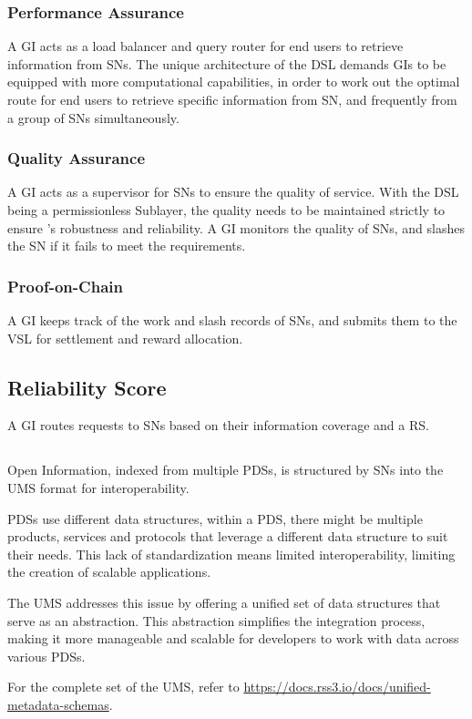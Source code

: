 \subsubsection{Performance Assurance} A GI acts as a load balancer and query router for end users to retrieve information from \glspl{SN}.
The unique architecture of the \gls{DSL} demands \glspl{GI} to be equipped with more computational capabilities, in order to work out the optimal route for end users to retrieve specific information from \gls{SN}, and frequently from a group of \glspl{SN} simultaneously.

\subsubsection{Quality Assurance} A GI acts as a supervisor for \glspl{SN} to ensure the quality of service.
With the \gls{DSL} being a permissionless Sublayer, the quality needs to be maintained strictly to ensure 's robustness and reliability.
A \gls{GI} monitors the quality of \glspl{SN}, and slashes the \gls{SN} if it fails to meet the requirements.

\subsubsection{Proof-on-Chain} A GI keeps track of the work and slash records of \glspl{SN}, and submits them to the \gls{VSL} for settlement and reward allocation.

\subsection{Reliability Score} 

A \gls{GI} routes requests to \glspl{SN} based on their information coverage and a \gls{RS}.

\subsection{}
\label{subsec:UMS}

Open Information, indexed from multiple \glspl{PDS}, is structured by \glspl{SN} into the \gls{UMS} format for interoperability.

\glspl{PDS} use different data structures, within a \gls{PDS}, there might be multiple products, services and protocols that leverage a different data structure to suit their needs.
This lack of standardization means limited interoperability, limiting the creation of scalable applications.

The \gls{UMS} addresses this issue by offering a unified set of data structures that serve as an abstraction.
This abstraction simplifies the integration process, making it more manageable and scalable for developers to work with data across various \glspl{PDS}.

For the complete set of the \gls{UMS}, refer to \url{https://docs.rss3.io/docs/unified-metadata-schemas}.


